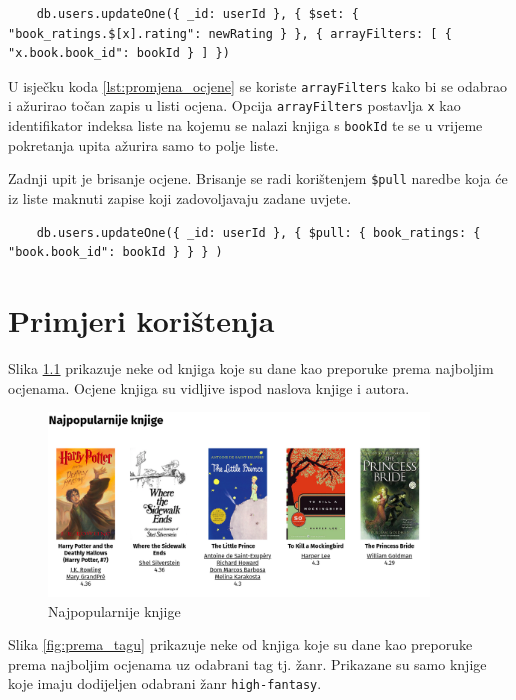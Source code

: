 \documentclass[]{foi}
\begin{document}
\begin{verbatim}
    db.users.updateOne({ _id: userId }, { $set: { "book_ratings.$[x].rating": newRating } }, { arrayFilters: [ { "x.book.book_id": bookId } ] })
\end{verbatim}
\label{lst:promjena_ocjene}

U isječku koda \ref{lst:promjena_ocjene} se koriste \texttt{arrayFilters} kako bi se odabrao i ažurirao točan zapis u listi ocjena.
Opcija \texttt{arrayFilters} postavlja \texttt{x} kao identifikator indeksa liste na kojemu se nalazi knjiga s \texttt{bookId} te se u
vrijeme pokretanja upita ažurira samo to polje liste.

Zadnji upit je brisanje ocjene. Brisanje se radi korištenjem \texttt{\$pull} naredbe koja će iz liste maknuti zapise koji zadovoljavaju zadane uvjete.
\begin{verbatim}
    db.users.updateOne({ _id: userId }, { $pull: { book_ratings: { "book.book_id": bookId } } } )
\end{verbatim}
\label{lst:brisanje_ocjene}

\chapter{Primjeri korištenja}

Slika \ref{fig:najpopulranije_knjige} prikazuje neke od knjiga koje su dane kao preporuke prema najboljim ocjenama.
Ocjene knjiga su vidljive ispod naslova knjige i autora.

\begin{figure}[h!]
	\centering
	\includegraphics[width=0.9\textwidth]{slike/najpop.png}
	\caption{Najpopularnije knjige}
	\label{fig:najpopulranije_knjige}
\end{figure}

Slika \ref{fig:prema_tagu} prikazuje neke od knjiga koje su dane kao preporuke prema najboljim ocjenama uz odabrani tag tj. žanr.
Prikazane su samo knjige koje imaju dodijeljen odabrani žanr \texttt{high-fantasy}.
\end{document}
